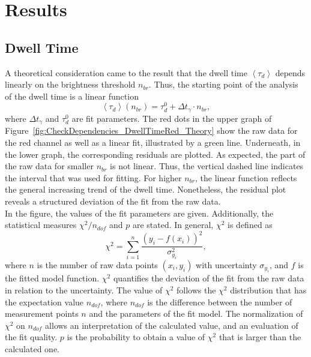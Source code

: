 \section{Results}

\subsection{Dwell Time} \label{Section:PropertiesDwellTime}

A theoretical consideration came to the result that the dwell time $\left\langle \tau_d \right\rangle$ depends linearly on the brightness threshold $n_{br}$. Thus, the starting point of the analysis of the dwell time is a linear function
\begin{equation}
	\left\langle \tau_d \right\rangle (n_{br}) = \tau_d^0 + \Delta t_{\gamma} \cdot n_{br},
\end{equation}
where $\Delta t_{\gamma}$ and $\tau_d^0$ are fit parameters. The red dots in the upper graph of Figure~\ref{fig:CheckDependencies_DwellTimeRed_Theory} show the raw data for the red channel as well as a linear fit, illustrated by a green line. Underneath, in the lower graph, the corresponding residuals are plotted. As expected, the part of the raw data for smaller $n_{br}$ is not linear. Thus, the vertical dashed line indicates the interval that was used for fitting. For higher $n_{br}$, the linear function reflects the general increasing trend of the dwell time. Nonetheless, the residual plot reveals a structured deviation of the fit from the raw data.\\

In the figure, the values of the fit parameters are given. Additionally, the statistical measures $\chi^2/ n_{dof}$ and $p$ are stated. In general, $\chi^2$ is defined as
\begin{equation}
	\chi^2 = \sum_{i=1}^{n} \frac{(y_i - f(x_i))^2}{\sigma_{y_i}^2},
\end{equation}
where $n$ is the number of raw data points $(x_i, y_i)$ with uncertainty $\sigma_{y_i}$, and $f$ is the fitted model function. $\chi^2$ quantifies the deviation of the fit from the raw data in relation to the uncertainty. The value of $\chi^2$ follows the $\chi^2$ distribution that has the expectation value $n_{dof}$, where $n_{dof}$ is the difference between the number of measurement points $n$ and the parameters of the fit model. The normalization of $\chi^2$ on $n_{dof}$ allows an interpretation of the calculated value, and an evaluation of the fit quality. $p$ is the probability to obtain a value of $\chi^2$ that is larger than the calculated one.

